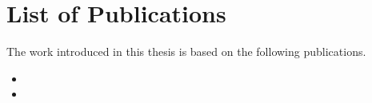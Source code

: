 \newpage
\chapter*{List of Publications}

The work introduced in this thesis is based on the following publications.

\begin{itemize} 

\item %

\item %

\end{itemize}